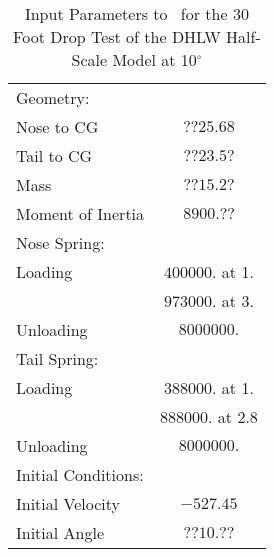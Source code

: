 \begin{table}
\begin{center}
\caption{Input Parameters to \SLAP\ for the 30 Foot Drop Test of the 
DHLW Half-Scale Model at 10$^\circ$}
\makeqnum
\begin{tabular}{||l|c||}
\hline
Geometry: & \\
\quad Nose to CG         &$??25.68$\\
\quad Tail to CG         &$??23.5?$\\
\quad Mass               &$??15.2?$\\
\quad Moment of Inertia  &$8900.??$\\
Nose Spring: & \\
\quad Loading            &$400000.$ at 1.\\
                   &$973000.$ at 3.\\
\quad Unloading          &$8000000.$\\
Tail Spring: &\\
\quad Loading            &$388000.$ at 1.\\
                   &$888000.$ at 2.8\\
\quad Unloading          &$8000000.$\\
\hline
Initial Conditions: & \\
\quad Initial Velocity   &$-527.45$\\
\quad Initial Angle      &$??10.??$\\
\hline
\end{tabular}
\end{center}
\end{table}

